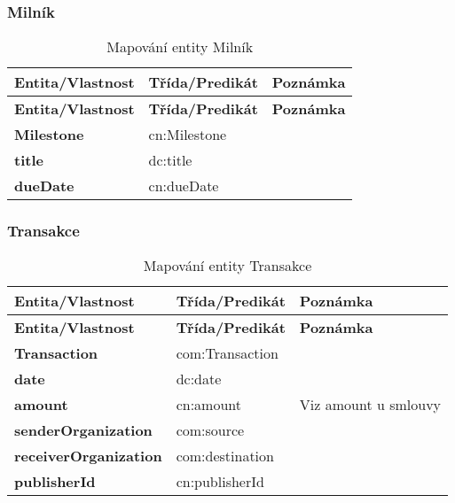 \subsubsection*{Milník}

\begin{center}
\begin{longtable}{lp{30mm}p{65mm}}
\label{grid_mlmmh} \\
\multicolumn{1}{l}{\textbf{Entita/Vlastnost}} & 
\multicolumn{1}{l}{\textbf{Třída/Predikát}} & 
\multicolumn{1}{l}{\textbf{Poznámka}} \\ \hline 
\endfirsthead
\multicolumn{1}{l}{\textbf{Entita/Vlastnost}} & 
\multicolumn{1}{l}{\textbf{Třída/Predikát}} & 
\multicolumn{1}{l}{\textbf{Poznámka}} \\ \hline 
\hline
\endhead
\endfoot
\caption{Mapování entity Milník}
\endlastfoot
\textbf{Milestone} & cn:Milestone \\
\textbf{title} & dc:title \\
\textbf{dueDate} & cn:dueDate \\
\end{longtable}
\end{center}

\subsubsection*{Transakce}

\begin{center}
\begin{longtable}{lp{30mm}p{65mm}}
\label{grid_mlmmh} \\
\multicolumn{1}{l}{\textbf{Entita/Vlastnost}} & 
\multicolumn{1}{l}{\textbf{Třída/Predikát}} & 
\multicolumn{1}{l}{\textbf{Poznámka}} \\ \hline 
\endfirsthead
\multicolumn{1}{l}{\textbf{Entita/Vlastnost}} & 
\multicolumn{1}{l}{\textbf{Třída/Predikát}} & 
\multicolumn{1}{l}{\textbf{Poznámka}} \\ \hline 
\hline
\endhead
\endfoot
\caption{Mapování entity Transakce}
\endlastfoot
\textbf{Transaction} & com:Transaction \\
\textbf{date} & dc:date \\
\textbf{amount} & cn:amount & Viz amount u smlouvy\\
\textbf{senderOrganization} & com:source \\
\textbf{receiverOrganization} & com:destination \\ 
\textbf{publisherId} & cn:publisherId \\
\end{longtable}
\end{center}

